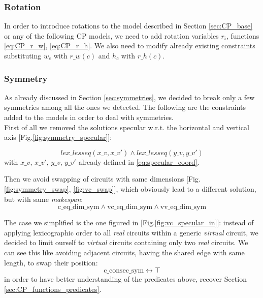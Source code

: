 
\subsubsection{Rotation}

In order to introduce rotations to the model described in Section \ref{sec:CP_base} or any
of the following CP models, we need to add rotation variables $r_i$, functions \ref{eq:CP_r_w}, \ref{eq:CP_r_h}. We
also need to modify already existing constraints substituting $w_c$ with $r\_w(c)$ and $h_c$ with $r\_h(c)$.

\subsubsection{Symmetry}

As already discussed in Section \ref{sec:symmetries}, we decided to break only a few symmetries among all the ones we
detected. The following are the constraints added to the models in order to deal with symmetries.\\

First of all we removed the solutions specular w.r.t. the horizontal and vertical axis [Fig.\ref{fig:symmetry_specular}]:

\begin{equation*}
  lex\_lesseq(x\_v, x\_v') \land lex\_lesseq(y\_v, y\_v')
\end{equation*}
with $x\_v$, $x\_v'$, $y\_v$, $y\_v'$ already defined in \ref{eq:specular_coord}.

Then we avoid swapping of circuits with same dimensions [Fig.\ref{fig:symmetry_swap}, \ref{fig:vc_swap}],
which obviously lead to a different solution, but with same \textit{makespan}:
\begin{equation*}
  \text{c\_eq\_dim\_sym} \land \text{vc\_eq\_dim\_sym} \land \text{vv\_eq\_dim\_sym}
\end{equation*}

The case we simplified is the one figured in [Fig.\ref{fig:vc_specular_in}]: instead of applying
lexicographic order to all \textit{real} circuits within a generic \textit{virtual} circuit, we
decided to limit ourself to \textit{virtual} circuits containing only two \textit{real} circuits.
We can see this like avoiding adjacent circuits, having the shared edge with same length,
to swap their position:
\begin{equation*}
  \text{c\_consec\_sym} \leftrightarrow \top
\end{equation*}
in order to have better understanding of the predicates above, recover Section \ref{sec:CP_functions_predicates}.

